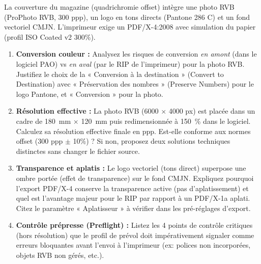 \documentclass[11pt]{article}
\begin{document}
\begin{exercice}
La couverture du magazine (quadrichromie offset) intègre une photo RVB (ProPhoto RVB, 300 ppp), un logo en tons directs (Pantone 286 C) et un fond vectoriel CMJN. L'imprimeur exige un PDF/X-4:2008 avec simulation du papier (profil ISO Coated v2 300\%).

\begin{enumerate}
    \item \textbf{Conversion couleur :} Analysez les risques de conversion \textit{en amont} (dans le logiciel PAO) vs \textit{en aval} (par le RIP de l'imprimeur) pour la photo RVB. Justifiez le choix de la « Conversion à la destination » (Convert to Destination) avec « Préservation des nombres » (Preserve Numbers) pour le logo Pantone, et « Conversion » pour la photo.
    \item \textbf{Résolution effective :} La photo RVB (6000 $\times$ 4000 px) est placée dans un cadre de \SI{180}{mm} $\times$ \SI{120}{mm} puis redimensionnée à \SI{150}{\%} dans le logiciel. Calculez sa résolution effective finale en ppp. Est-elle conforme aux normes offset (300 ppp $\pm$ 10\%) ? Si non, proposez deux solutions techniques distinctes sans changer le fichier source.
    \item \textbf{Transparence et aplatis :} Le logo vectoriel (tons direct) superpose une ombre portée (effet de transparence) sur le fond CMJN. Expliquez pourquoi l'export PDF/X-4 conserve la transparence active (pas d'aplatissement) et quel est l'avantage majeur pour le RIP par rapport à un PDF/X-1a aplati. Citez le paramètre « Aplatisseur » à vérifier dans les pré-réglages d'export.
    \item \textbf{Contrôle prépresse (Preflight) :} Listez les 4 points de contrôle critiques (hors résolution) que le profil de prévol doit impérativement signaler comme erreurs bloquantes avant l'envoi à l'imprimeur (ex: polices non incorporées, objets RVB non gérés, etc.).
\end{enumerate}
\end{exercice}
\end{document}
